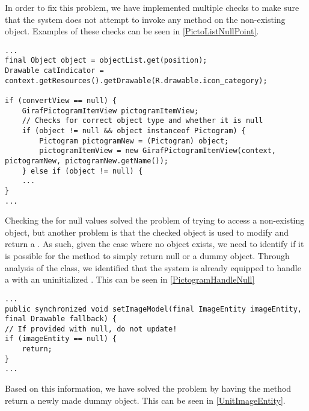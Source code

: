 In order to fix this problem, we have implemented multiple checks to make sure
that the system does not attempt to invoke any method on the non-existing
object. Examples of these checks can be seen in \autoref{PictoListNullPoint}.\nl

\begin{minipage}[H]{\linewidth}
\begin{lstlisting}[caption = Newly implemented check for null values., label = PictoListNullPoint] 
...
final Object object = objectList.get(position);
Drawable catIndicator = context.getResources().getDrawable(R.drawable.icon_category);

if (convertView == null) {
	GirafPictogramItemView pictogramItemView;
	// Checks for correct object type and whether it is null
    if (object != null && object instanceof Pictogram) {
    	Pictogram pictogramNew = (Pictogram) object;
        pictogramItemView = new GirafPictogramItemView(context, pictogramNew, pictogramNew.getName());
	} else if (object != null) {
	...
}
...
\end{lstlisting}
\end{minipage}

Checking the  for null values solved the problem of trying to
access a non-existing object, but another problem is that the checked object is used to
modify and return a . As such, given the case where no
object exists, we need to identify if it is possible for the method to simply
return null or a dummy object. Through analysis of the
 class, we identified that the system is already
equipped to handle a  with an uninitialized
. This can be seen in \autoref{PictogramHandleNull}\nl

\begin{minipage}[H]{\linewidth}
\begin{lstlisting}[caption = \textc{setImageModel} method in the \textc{GirafPictogramItemView class.}, label = PictogramHandleNull] 
...
public synchronized void setImageModel(final ImageEntity imageEntity, final Drawable fallback) {
// If provided with null, do not update!
if (imageEntity == null) {
	return;
}
...
\end{lstlisting}
\end{minipage}

Based on this information, we have solved the problem by having the
 method return a newly made dummy object. This can be seen
in \autoref{UnitImageEntity}.\nl

